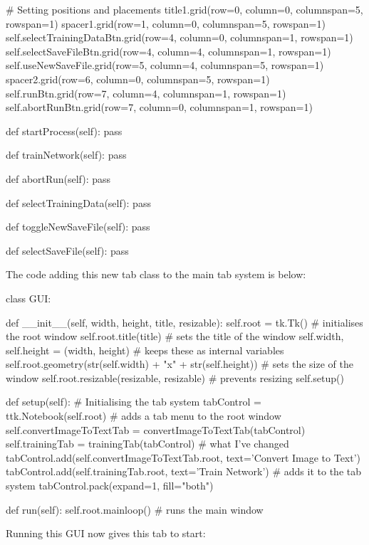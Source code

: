 \documentclass{report}
\begin{document}
\begin{python}
        # Setting positions and placements
        title1.grid(row=0, column=0, columnspan=5, rowspan=1)
        spacer1.grid(row=1, column=0, columnspan=5, rowspan=1)
        self.selectTrainingDataBtn.grid(row=4, column=0, columnspan=1, rowspan=1)
        self.selectSaveFileBtn.grid(row=4, column=4, columnspan=1, rowspan=1)
        self.useNewSaveFile.grid(row=5, column=4, columnspan=5, rowspan=1)
        spacer2.grid(row=6, column=0, columnspan=5, rowspan=1)
        self.runBtn.grid(row=7, column=4, columnspan=1, rowspan=1)
        self.abortRunBtn.grid(row=7, column=0, columnspan=1, rowspan=1)

    def startProcess(self):
        pass

    def trainNetwork(self):
        pass

    def abortRun(self):
        pass

    def selectTrainingData(self):
        pass

    def toggleNewSaveFile(self):
        pass

    def selectSaveFile(self):
        pass
\end{python}
The code adding this new tab class to the main tab system is below:
\begin{python}
class GUI:

    def __init__(self, width, height, title, resizable):
        self.root = tk.Tk()  # initialises the root window
        self.root.title(title)  # sets the title of the window
        self.width, self.height = (width, height)  # keeps these as internal variables
        self.root.geometry(str(self.width) + "x" + str(self.height))  # sets the size of the window
        self.root.resizable(resizable, resizable)  # prevents resizing
        self.setup()

    def setup(self):
        # Initialising the tab system
        tabControl = ttk.Notebook(self.root)  # adds a tab menu to the root window
        self.convertImageToTextTab = convertImageToTextTab(tabControl)
        self.trainingTab = trainingTab(tabControl)  # what I've changed
        tabControl.add(self.convertImageToTextTab.root, text='Convert Image to Text')
        tabControl.add(self.trainingTab.root, text='Train Network')  # adds it to the tab system
        tabControl.pack(expand=1, fill="both")

    def run(self):
        self.root.mainloop()  # runs the main window
\end{python}
Running this GUI now gives this tab to start:
\end{document}
